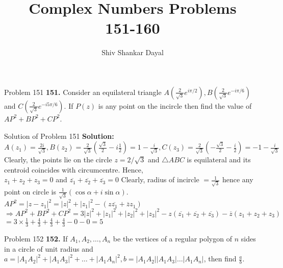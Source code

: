 \documentclass[aspectratio=169,8pt]{beamer}
\title{Complex Numbers Problems\\ 151-160}
\author[Shiv Shankar Dayal]{Shiv Shankar Dayal}
\begin{document}
\begin{frame}
  \titlepage
\end{frame}
\begin{frame}{Problem 151}
  \textbf{151.} Consider an equilateral triangle $A\left(\frac{2}{\sqrt{3}}e^{i\pi/2}\right),
  B\left(\frac{2}{\sqrt{3}}e^{-i\pi/6}\right)$ and $C\left(\frac{2}{\sqrt{3}}e^{-i5\pi/6}\right)$. If $P(z)$ is any point on the
  incircle then find the value of $AP^2 + BP^2 + CP^2$.
\end{frame}
\begin{frame}{Solution of Problem 151}
  \textbf{Solution:} $A(z_1) = \frac{2i}{\sqrt{3}},B(z_2) = \frac{2}{\sqrt{3}}\left(\frac{\sqrt{3}}{2} - i\frac{1}{2}\right) = 1 -
  \frac{i}{\sqrt{3}}, C(z_3) = \frac{2}{\sqrt{3}}\left(-\frac{\sqrt{3}}{2} - \frac{i}{2}\right) = -1-\frac{i}{\sqrt{3}}$\\
  \vspace*{0.2cm}
  Clearly, the points lie on the circle $z=2/\sqrt{3}$ and $\triangle ABC$ is equilateral and its centroid coincides with
  circumcentre. Hence,\\
  \vspace*{0.2cm}
  $z_1 + z_2 + z_3 = 0$ and $\overline{z_1} + \overline{z_2} + \overline{z_3} = 0$
  Clearly, radius of incircle $= \frac{1}{\sqrt{3}}$ hence any point on circle is $\frac{1}{\sqrt{3}}(\cos\alpha + i\sin\alpha)$.\\
  \vspace*{0.2cm}
  $AP^2 = |z - z_1|^2 = |z|^2 + |z_1|^2 - (z\overline{z_1} + \overline{z}z_1)$
  \vspace*{0.2cm}
  $\Rightarrow AP^2 + BP^2 + CP^2 = 3|z|^2 + |z_1|^2 + |z_2|^2 + |z_3|^2 - z(\overline{z_1} + \overline{z_2} + \overline{z_3}) -
  \overline{z}(z_1 + z_2 + z_3)$\\
  \vspace*{0.2cm}
  $= 3\times\frac{1}{3} + \frac{4}{3} + \frac{4}{3} + \frac{4}{3} - 0 - 0 = 5$
\end{frame}
\begin{frame}{Problem 152}
  \textbf{152.} If $A_1, A_2, \ldots, A_n$ be the vertices of a regular polygon of $n$ sides in a circle of unit radius and $a =
  |A_1A_2|^2 + |A_1A_3|^2 + \ldots + |A_1A_n|^2, b = |A_1A_2||A_1A_3|\ldots |A_1A_n|$, then find $\frac{a}{b}$.
\end{frame}
\end{document}
